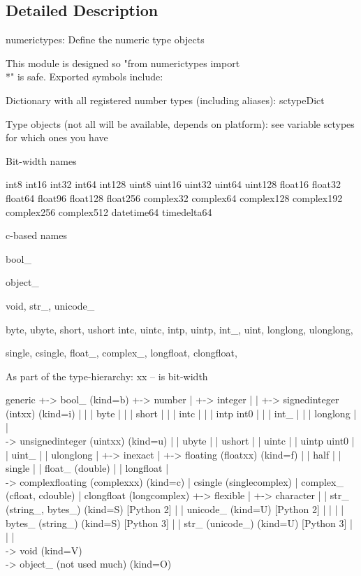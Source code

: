 \subsection{Detailed Description}
\begin{DoxyVerb}numerictypes: Define the numeric type objects

This module is designed so "from numerictypes import \\*" is safe.
Exported symbols include:

  Dictionary with all registered number types (including aliases):
sctypeDict

  Type objects (not all will be available, depends on platform):
  see variable sctypes for which ones you have

Bit-width names

int8 int16 int32 int64 int128
uint8 uint16 uint32 uint64 uint128
float16 float32 float64 float96 float128 float256
complex32 complex64 complex128 complex192 complex256 complex512
datetime64 timedelta64

c-based names

bool_

object_

void, str_, unicode_

byte, ubyte,
short, ushort
intc, uintc,
intp, uintp,
int_, uint,
longlong, ulonglong,

single, csingle,
float_, complex_,
longfloat, clongfloat,

   As part of the type-hierarchy:    xx -- is bit-width

   generic
 +-> bool_                                  (kind=b)
 +-> number
 |   +-> integer
 |   |   +-> signedinteger     (intxx)      (kind=i)
 |   |   |     byte
 |   |   |     short
 |   |   |     intc
 |   |   |     intp            int0
 |   |   |     int_
 |   |   |     longlong
 |   |   \\-> unsignedinteger  (uintxx)     (kind=u)
 |   |         ubyte
 |   |         ushort
 |   |         uintc
 |   |         uintp           uint0
 |   |         uint_
 |   |         ulonglong
 |   +-> inexact
 |       +-> floating          (floatxx)    (kind=f)
 |       |     half
 |       |     single
 |       |     float_          (double)
 |       |     longfloat
 |       \\-> complexfloating  (complexxx)  (kind=c)
 |             csingle         (singlecomplex)
 |             complex_        (cfloat, cdouble)
 |             clongfloat      (longcomplex)
 +-> flexible
 |   +-> character
 |   |     str_     (string_, bytes_)       (kind=S)    [Python 2]
 |   |     unicode_                         (kind=U)    [Python 2]
 |   |
 |   |     bytes_   (string_)               (kind=S)    [Python 3]
 |   |     str_     (unicode_)              (kind=U)    [Python 3]
 |   |
 |   \\-> void                              (kind=V)
 \\-> object_ (not used much)               (kind=O)\end{DoxyVerb}
 


